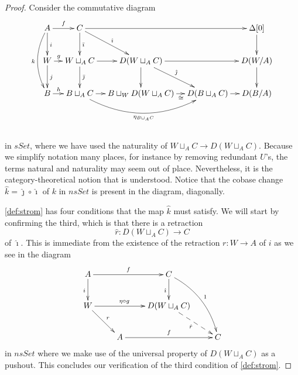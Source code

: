 \begin{proof}
Consider the commutative diagram
\begin{equation}
\label{eq:diagram_proof_of_lem_Strom-maps_closed_under_cobasechange_big}
\begin{gathered}
\xymatrix@C=1em{
  A \ar@/_1pc/[dd]_k \ar[r]^f \ar[d]^i & C \ar[d]^{\bar{\imath }} \ar[dr]^{\hat{\imath }} \ar[rrr] &&& \Delta [0] \ar[d] \\
  W \ar[r]^(.35)g \ar[d]^j & W\sqcup _A C \ar[d]^{\bar{\jmath }} \ar[r] & D(W\sqcup _AC) \ar[dr]^{\hat{\jmath }} \ar[rr] \ar[d] && D(W/A) \ar[d]\\
  B \ar[r]^(.35)h & B\sqcup _AC \ar@/_2pc/[rr]_{\eta _{B\sqcup _AC}} \ar[r] & B\sqcup _WD(W\sqcup _AC) \ar[r]_(.6)\cong & D(B\sqcup _AC) \ar[r] & D(B/A) \\
}
\end{gathered}
\end{equation}
\\
in $sSet$, where we have used the naturality of $W\sqcup _AC\to D(W\sqcup _AC)$. Because we simplify notation many places, for instance by removing redundant $U$'s, the terms natural and naturality may seem out of place. Nevertheless, it is the category-theoretical notion that is understood. Notice that the cobase change $\hat{k} =\hat{\jmath } \circ \hat{\imath }$ of $k$ in $nsSet$ is present in the diagram, diagonally.

\cref{def:strom} has four conditions that the map $\hat{k}$ must satisfy. We will start by confirming the third, which is that there is a retraction
\[\hat{r} :D(W\sqcup _AC)\to C\]
of $\hat{\imath }$. This is immediate from the existence of the retraction $r:W\to A$ of $i$ as we see in the diagram
\begin{displaymath}
\xymatrix{ %
  A \ar[rr]^f \ar[d]_i && C \ar[d]_{\hat{\imath }} \ar@/^1pc/[ddr]^1 \\
  W \ar[dr]^r \ar[rr]^(.45){\eta \circ g} && D(W\sqcup _AC) \ar@{-->}[dr]_{\hat{r} } \\
  & A \ar[rr]^f && C
}
\end{displaymath}
in $nsSet$ where we make use of the universal property of $D(W\sqcup _AC)$ as a pushout. This concludes our verification of the third condition of \cref{def:strom}.


\end{proof}
